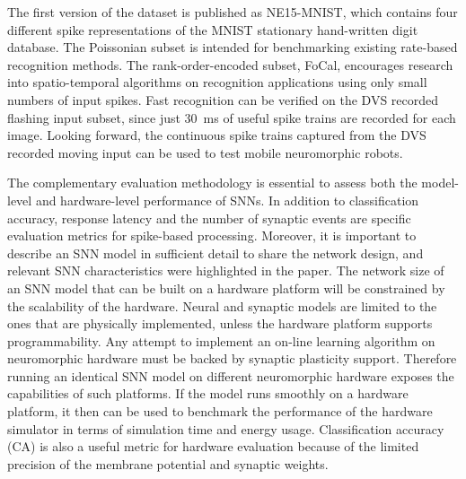 \documentclass{frontiersENG} %
\begin{document}
The first version of the dataset is published as NE15-MNIST, which contains four different spike representations of the MNIST stationary hand-written digit database.
The Poissonian subset is intended for benchmarking existing rate-based recognition methods.
The rank-order-encoded subset, FoCal, encourages research into spatio-temporal algorithms on recognition applications using only small numbers of input spikes.
Fast recognition can be verified on the DVS recorded flashing input subset, since just 30~ms of useful spike trains are recorded for each image.
Looking forward, the continuous spike trains captured from the DVS recorded moving input can be used to test mobile neuromorphic robots.

The complementary evaluation methodology is essential to assess both the model-level and hardware-level performance of SNNs.
In addition to classification accuracy, response latency and the number of synaptic events are specific evaluation metrics for spike-based processing.
Moreover, it is important to describe an SNN model in sufficient detail to share the network design, and relevant SNN characteristics were highlighted in the paper.  
The network size of an SNN model that can be built on a hardware platform will be constrained by the scalability of the hardware.
Neural and synaptic models are limited to the ones that are physically implemented, unless the hardware platform supports programmability.
Any attempt to implement an on-line learning algorithm on neuromorphic hardware must be backed by synaptic plasticity support.
Therefore running an identical SNN model on different neuromorphic hardware exposes the capabilities of such platforms.
If the model runs smoothly on a hardware platform, it then can be used to benchmark the performance of the hardware simulator in terms of simulation time and energy usage.
Classification accuracy (CA) is also a useful metric for hardware evaluation because of the limited precision of the membrane potential and synaptic weights.
\end{document}
